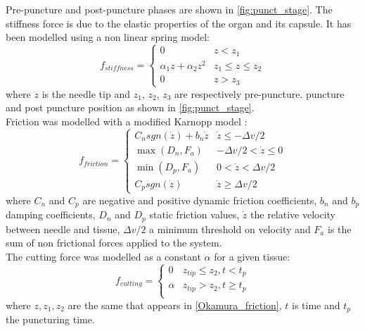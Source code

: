 Pre-puncture and post-puncture phases are shown in \figurename{ \ref{fig:punct_stage}}. The stiffness force is due to the elastic properties of the organ and its capsule.
It has been modelled using a non linear spring model:
\begin{equation}
	f_{stiffness} = 	
	\begin{cases}
		0 & z < z_{1} \\
		\alpha_{1}z + \alpha_{2}z^{2} & z_{1} \leq z \leq z_{2} \\
		0 & z > z_{3}
	\end{cases}
	\label{Okamura_stiffnes}
\end{equation}
where $z$ is the needle tip and $z_{1}$, $z_{2}$, $z_{3}$ are respectively pre-puncture. puncture and post puncture position as shown in \figurename{ \ref{fig:punct_stage}}.\\
Friction was modelled with a modified Karnopp model \cite{Dean1985}:
\begin{equation}	
		f_{friction} = 
		\begin{cases}
		C_{n}sgn\left( \dot{z}\right)  + b_{n}\dot{z} & \dot{z} \leq -\Delta v/2\\
		\max\left(D_{n},F_{a}\right) & -\Delta v/2 < \dot{z} \leq 0 \\
		\min\left( D_{p},F_{a}\right) & 0 < \dot{z} < \Delta v/2 \\
		C_{p}sgn\left(\dot{z} \right)  & \dot{z} \geq \Delta v/2
	\end{cases}
	\label{Okamura_friction}
\end{equation}
where $C_{n}$ and $C_{p}$ are negative and positive dynamic friction coefficients, $b_{n}$ and $b_{p}$ damping coefficients, $D_{n}$ and $D_{p}$ static friction values, $\dot{z}$ the relative velocity between needle and tissue, $\Delta v/2$ a minimum threshold on velocity and $F_{a}$ is the sum of non frictional forces applied to the system.\\
The cutting force was modelled as a constant $\alpha$ for a given tissue:
\begin{equation}
	\label{Okamura_cutting}
	f_{cutting} = 	
\begin{cases}
	0 & z_{tip} \leq z_{2}, t<t_{p} \\
	\alpha & z_{tip} > z_{2}, t\geq t_{p} \\
\end{cases}
\end{equation}
where $z,z_{1},z_{2}$ are the same that appears in \eqref{Okamura_friction}, $t$ is time and $t_{p}$ the puncturing time.

